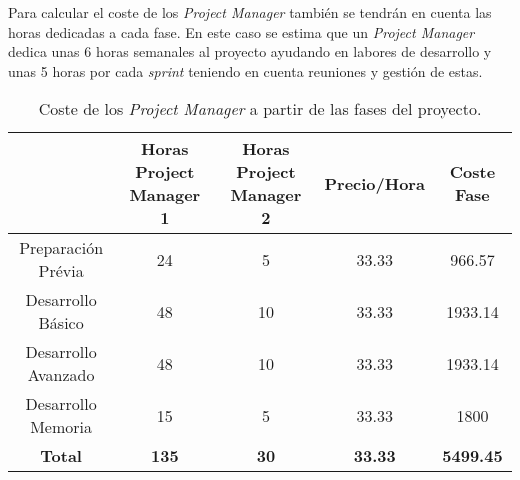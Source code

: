 Para calcular el coste de los \textit{Project Manager} también se tendrán en cuenta las horas dedicadas a cada fase. En este caso se estima que un \textit{Project Manager} dedica unas 6 horas semanales al proyecto ayudando en labores de desarrollo y unas 5 horas por cada \textit{sprint} teniendo en cuenta reuniones y gestión de estas.

\begin{table}[h]
\begin{center}
\begin{tabular}{ccccc}
\hline
\rowcolor[HTML]{C0C0C0} 
\multicolumn{1}{|c|}{\cellcolor[HTML]{C0C0C0}\textbf{Fase}} & \multicolumn{1}{p{3cm}|}{\cellcolor[HTML]{C0C0C0}\textbf{Horas Project Manager 1}} & \multicolumn{1}{p{3cm}|}{\cellcolor[HTML]{C0C0C0}\textbf{Horas Project Manager 2}} & \multicolumn{1}{c|}{\cellcolor[HTML]{C0C0C0}\textbf{Precio/Hora}} & \multicolumn{1}{c|}{\cellcolor[HTML]{C0C0C0}\textbf{Coste Fase}} \\ \hline
\multicolumn{1}{|c|}{Preparación Prévia}                    & \multicolumn{1}{c|}{24}                                                       & \multicolumn{1}{c|}{5}                                                        & \multicolumn{1}{c|}{33.33}                                        & \multicolumn{1}{c|}{966.57}                                      \\ \hline
\multicolumn{1}{|c|}{Desarrollo Básico}                     & \multicolumn{1}{c|}{48}                                                       & \multicolumn{1}{c|}{10}                                                       & \multicolumn{1}{c|}{33.33}                                        & \multicolumn{1}{c|}{1933.14}                                     \\ \hline
\multicolumn{1}{|c|}{Desarrollo Avanzado}                   & \multicolumn{1}{c|}{48}                                                       & \multicolumn{1}{c|}{10}                                                       & \multicolumn{1}{c|}{33.33}                                        & \multicolumn{1}{c|}{1933.14}                                     \\ \hline
\multicolumn{1}{|c|}{Desarrollo Memoria}                    & \multicolumn{1}{c|}{15}                                                       & \multicolumn{1}{c|}{5}                                                        & \multicolumn{1}{c|}{33.33}                                        & \multicolumn{1}{c|}{1800}                                        \\ \hline
\rowcolor[HTML]{656565} 
{\color[HTML]{FFFFFF} \textbf{Total}}                       & {\color[HTML]{FFFFFF} \textbf{135}}                                           & {\color[HTML]{FFFFFF} \textbf{30}}                                            & {\color[HTML]{FFFFFF} \textbf{33.33}}                             & {\color[HTML]{FFFFFF} \textbf{5499.45}}                         
\end{tabular}
\end{center}
\caption{Coste de los \textit{Project Manager} a partir de las fases del proyecto. \label{tab:salarioManager}}
\end{table}

